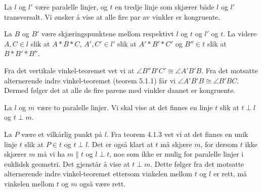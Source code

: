 

\begin{oppgave}[5.1.1]
    La $l$ og $l'$ være paralelle linjer, og $t$ en tredje linje som skjærer både $l$ og $l'$ transversalt. 
    Vi ønsker å vise at alle fire par av vinkler er kongruente. 

    La $B$ og $B'$ være skjæringspunktene mellom respektivt $l$ og $t$ og $l'$ og $t$. 
    La videre $A, C\in l$ slik at $A\ast B\ast C$, $A', C'\in l'$ slik at $A'\ast B'\ast C'$ og $B''\in t$ slik at $B\ast B'\ast B''$. 

    \begin{figure}[H]
        \centering
         
    \end{figure}

    Fra det vertikale vinkel-teoremet vet vi at $\angle B''B'C'\cong \angle A'B'B$. 
    Fra det motsatte alternerende indre vinkel-teoremet (teorem 5.1.1) får vi $\angle A'B'B\cong \angle B'BC$.
    Dermed følger det at alle de fire parene med vinkler dannet er kongruente. 
\end{oppgave}

\begin{oppgave}[5.1.9]
    La $l$ og $m$ være to paralelle linjer. 
    Vi skal vise at det finnes en linje $t$ slik at $t\perp l$ og $t\perp m$. 
    
    La $P$ være et vilkårlig punkt på $l$. 
    Fra teorem 4.1.3 vet vi at det finnes en unik linje $t$ slik at $P\in t$ og $t\perp l$.
    Det er også klart at $t$ må skjære $m$, for dersom $t$ ikke skjærer $m$ må vi ha $m\parallel t$ og $l\perp t$, noe som ikke er mulig for paralelle linjer i euklidsk geometri.
    Det gjenstår å vise at $t\perp m$. 
    Dette følger fra det motsatte alternerende indre vinkel-teoremet ettersom vinkelen mellom $t$ og $l$ er rett, må vinkelen mellom $t$ og $m$ også være rett. 
\end{oppgave}

